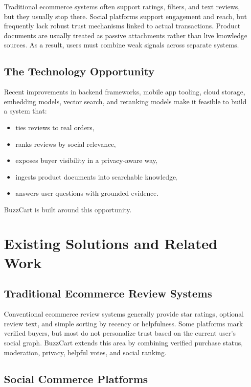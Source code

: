 \documentclass[12pt,letterpaper]{report}
\begin{document}
Traditional ecommerce systems often support ratings, filters, and text reviews, but they usually stop there. Social platforms support engagement and reach, but frequently lack robust trust mechanisms linked to actual transactions. Product documents are usually treated as passive attachments rather than live knowledge sources. As a result, users must combine weak signals across separate systems.

\section{The Technology Opportunity}

Recent improvements in backend frameworks, mobile app tooling, cloud storage, embedding models, vector search, and reranking models make it feasible to build a system that:

\begin{itemize}
  \item ties reviews to real orders,
  \item ranks reviews by social relevance,
  \item exposes buyer visibility in a privacy-aware way,
  \item ingests product documents into searchable knowledge,
  \item answers user questions with grounded evidence.
\end{itemize}

BuzzCart is built around this opportunity.

\chapter{Existing Solutions and Related Work}

\section{Traditional Ecommerce Review Systems}

Conventional ecommerce review systems generally provide star ratings, optional review text, and simple sorting by recency or helpfulness. Some platforms mark verified buyers, but most do not personalize trust based on the current user's social graph. BuzzCart extends this area by combining verified purchase status, moderation, privacy, helpful votes, and social ranking.

\section{Social Commerce Platforms}
\end{document}
